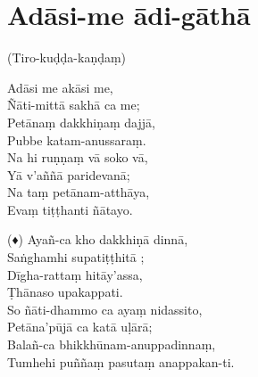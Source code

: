 \chapter{Adāsi-me ādi-gāthā}

(Tiro-kuḍḍa-kaṇḍaṃ)

Adāsi me akāsi me,\\
Ñāti-mittā sakhā ca me;\\
Petānaṃ dakkhiṇaṃ dajjā,\\
Pubbe katam-anussaraṃ.\\
Na hi ruṇṇaṃ vā soko vā,\\
Yā v'aññā paridevanā;\\
Na taṃ petānam-atthāya,\\
Evaṃ tiṭṭhanti ñātayo.

(♦) Ayañ-ca kho dakkhiṇā dinnā,\\
Saṅghamhi supatiṭṭhitā ;\\
Dīgha-rattaṃ hitāy'assa,\\
Ṭhānaso upakappati.\\
So ñāti-dhammo ca ayaṃ nidassito,\\
Petāna'pūjā ca katā uḷārā;\\
Balañ-ca bhikkhūnam-anuppadinnaṃ,\\
Tumhehi puññaṃ pasutaṃ anappakan-ti.


